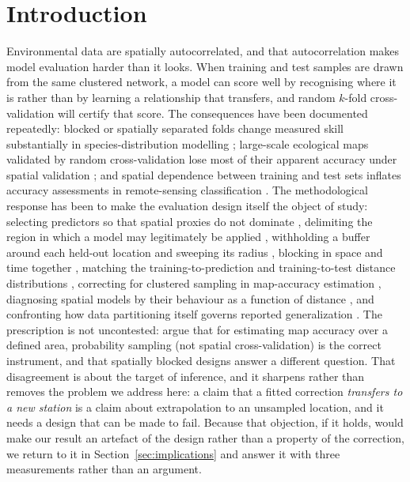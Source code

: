 \documentclass[review,times,authoryear]{elsarticle}
\begin{document}
\linenumbers
\section{Introduction}

Environmental data are spatially autocorrelated, and that autocorrelation makes model
evaluation harder than it looks. When training and test samples are drawn from the same
clustered network, a model can score well by recognising where it is rather than by
learning a relationship that transfers, and random $k$-fold cross-validation will
certify that score. The consequences have been documented repeatedly: blocked or
spatially separated folds change measured skill substantially in species-distribution
modelling \citep{roberts2017,valavi2019blockcv}; large-scale ecological maps validated by
random cross-validation lose most of their apparent accuracy under spatial validation
\citep{ploton2020}; and spatial dependence between training and test sets inflates
accuracy assessments in remote-sensing classification \citep{karasiak2022}. The
methodological response has been to make the evaluation design itself the object of
study: selecting predictors so that spatial proxies do not dominate
\citep{meyer2019predictors}, delimiting the region in which a model may legitimately be
applied \citep{meyer2021aoa,meyer2022global}, withholding a buffer around each held-out
location and sweeping its radius \citep{telford2009,lerest2014,pohjankukka2017}, blocking
in space and time together \citep{meyer2018llto}, matching the training-to-prediction and
training-to-test distance distributions \citep{mila2022nndm,linnenbrink2024}, correcting
for clustered sampling in map-accuracy estimation \citep{debruin2022}, diagnosing spatial
models by their behaviour as a function of distance \citep{brenning2023}, and confronting
how data partitioning itself governs reported generalization \citep{maier2023}. The
prescription is not uncontested: \citet{wadoux2021} argue that for estimating map accuracy
over a defined area, probability sampling (not spatial cross-validation) is the correct
instrument, and that spatially blocked designs answer a different question. That
disagreement is about the target of inference, and it sharpens rather than removes the
problem we address here: a claim that a fitted correction \emph{transfers to a new
station} is a claim about extrapolation to an unsampled location, and it needs a design
that can be made to fail. Because that objection, if it holds, would make our result an
artefact of the design rather than a property of the correction, we return to it in
Section~\ref{sec:implications} and answer it with three measurements rather than an argument.
\end{document}
